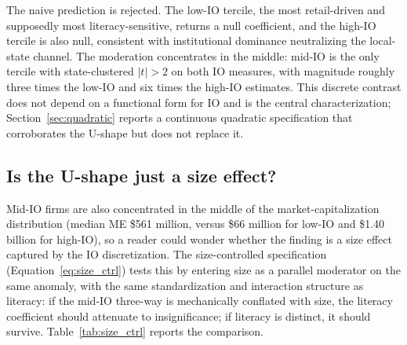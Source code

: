The naive prediction is rejected. The low-IO tercile, the most retail-driven and supposedly most literacy-sensitive, returns a null coefficient, and the high-IO tercile is also null, consistent with institutional dominance neutralizing the local-state channel. The moderation concentrates in the middle: mid-IO is the only tercile with state-clustered $|t| > 2$ on both IO measures, with magnitude roughly three times the low-IO and six times the high-IO estimates. This discrete contrast does not depend on a functional form for IO and is the central characterization; Section~\ref{sec:quadratic} reports a continuous quadratic specification that corroborates the U-shape but does not replace it.

\subsection{Is the U-shape just a size effect?}
\label{sec:size_controlled_result}

Mid-IO firms are also concentrated in the middle of the market-capitalization distribution (median ME \$561 million, versus \$66 million for low-IO and \$1.40 billion for high-IO), so a reader could wonder whether the finding is a size effect captured by the IO discretization. The size-controlled specification (Equation~\ref{eq:size_ctrl}) tests this by entering size as a parallel moderator on the same anomaly, with the same standardization and interaction structure as literacy: if the mid-IO three-way is mechanically conflated with size, the literacy coefficient should attenuate to insignificance; if literacy is distinct, it should survive. Table~\ref{tab:size_ctrl} reports the comparison.

